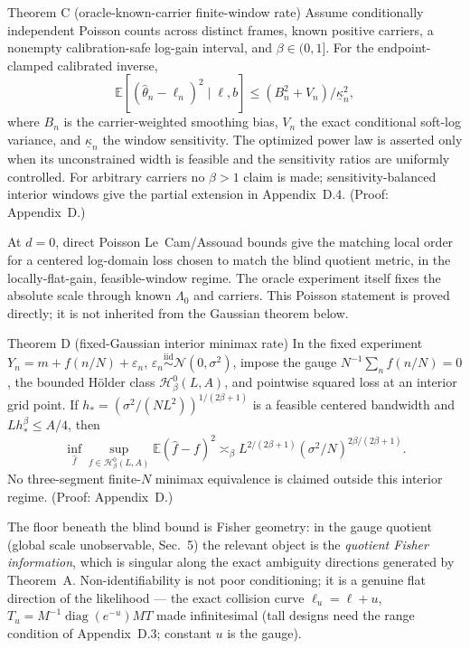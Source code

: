 \begin{namedthm}{Theorem C (oracle-known-carrier finite-window rate)}
Assume conditionally independent Poisson counts across distinct frames, known positive carriers, a nonempty calibration-safe log-gain interval, and $\beta\in(0,1]$. For the endpoint-clamped calibrated inverse,
\[
\mathbb E[(\hat\theta_n-\ell_n)^2\mid\ell,b]
\le(B_n^2+V_n)/\underline\kappa_n^2,
\]
where $B_n$ is the carrier-weighted smoothing bias, $V_n$ the exact conditional soft-log variance, and $\underline\kappa_n$ the window sensitivity. The optimized power law is asserted only when its unconstrained width is feasible and the sensitivity ratios are uniformly controlled. For arbitrary carriers no $\beta>1$ claim is made; sensitivity-balanced interior windows give the partial extension in Appendix~D.4. (Proof: Appendix~D.)
\end{namedthm}

At $d=0$, direct Poisson Le~Cam/Assouad bounds give the matching local order for a centered log-domain loss chosen to match the blind quotient metric, in the locally-flat-gain, feasible-window regime. The oracle experiment itself fixes the absolute scale through known $\Lambda_0$ and carriers. This Poisson statement is proved directly; it is not inherited from the Gaussian theorem below.

\begin{namedthm}{Theorem D (fixed-Gaussian interior minimax rate)}
In the fixed experiment $Y_n=m+f(n/N)+\varepsilon_n$, $\varepsilon_n\stackrel{\mathrm{iid}}{\sim}\mathcal N(0,\sigma^2)$, impose the gauge $N^{-1}\sum_nf(n/N)=0$, the bounded H\"older class $\mathcal H_\beta^0(L,A)$, and pointwise squared loss at an interior grid point. If $h_*=(\sigma^2/(NL^2))^{1/(2\beta+1)}$ is a feasible centered bandwidth and $Lh_*^\beta\le A/4$, then
\[
\inf_{\hat f}\sup_{f\in\mathcal H_\beta^0(L,A)}
\mathbb E(\hat f-f)^2\asymp_\beta
L^{2/(2\beta+1)}(\sigma^2/N)^{2\beta/(2\beta+1)}.
\]
No three-segment finite-$N$ minimax equivalence is claimed outside this interior regime. (Proof: Appendix~D.)
\end{namedthm}

The floor beneath the blind bound is Fisher geometry: in the gauge quotient (global scale unobservable, Sec.~5) the relevant object is the \emph{quotient Fisher information}, which is singular along the exact ambiguity directions generated by Theorem~A. Non-identifiability is not poor conditioning; it is a genuine flat direction of the likelihood --- the exact collision curve $\ell_u=\ell+u$, $T_u=M^{-1}\operatorname{diag}(e^{-u})MT$ made infinitesimal (tall designs need the range condition of Appendix~D.3; constant $u$ is the gauge).


